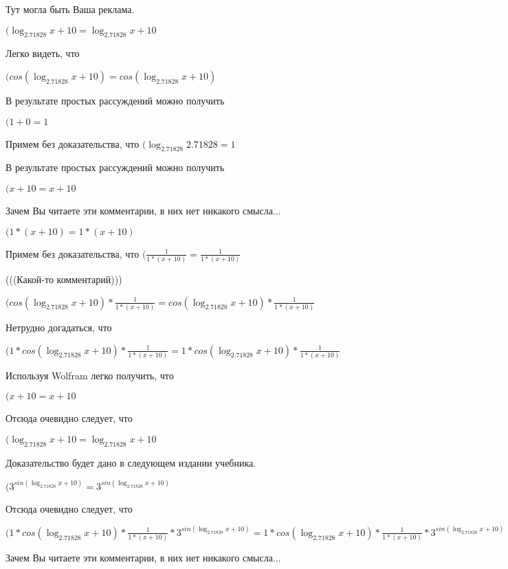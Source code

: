 \documentclass[12pt,a4paper,fleqn]{article}
\theoremstyle{definition}
\begin{document}
Тут могла быть Ваша реклама.

$(\log_{ 2.71828 }{ x  +  10 } = \log_{ 2.71828 }{ x  +  10 }$

Легко видеть, что

$(cos(\log_{ 2.71828 }{ x  +  10 }) = cos(\log_{ 2.71828 }{ x  +  10 })$

В результате простых рассуждений можно получить

$( 1  +  0  =  1 $

Примем без доказательства, что
$(\log_{ 2.71828 }{ 2.71828 } =  1 $

В результате простых рассуждений можно получить

$( x  +  10  =  x  +  10 $

Зачем Вы читаете эти комментарии, в них нет никакого смысла...

$( 1  * ( x  +  10 ) =  1  * ( x  +  10 )$

Примем без доказательства, что
$(\frac{ 1 }{ 1  * ( x  +  10 )}
 = \frac{ 1 }{ 1  * ( x  +  10 )}
$

(((Какой-то комментарий)))

$(cos(\log_{ 2.71828 }{ x  +  10 }) * \frac{ 1 }{ 1  * ( x  +  10 )}
 = cos(\log_{ 2.71828 }{ x  +  10 }) * \frac{ 1 }{ 1  * ( x  +  10 )}
$

Нетрудно догадаться, что

$( 1  * cos(\log_{ 2.71828 }{ x  +  10 }) * \frac{ 1 }{ 1  * ( x  +  10 )}
 =  1  * cos(\log_{ 2.71828 }{ x  +  10 }) * \frac{ 1 }{ 1  * ( x  +  10 )}
$

Используя Wolfram легко получить, что

$( x  +  10  =  x  +  10 $

Отсюда очевидно следует, что

$(\log_{ 2.71828 }{ x  +  10 } = \log_{ 2.71828 }{ x  +  10 }$

Доказательство будет дано в следующем издании учебника.

$({ 3 }^{sin(\log_{ 2.71828 }{ x  +  10 })} = { 3 }^{sin(\log_{ 2.71828 }{ x  +  10 })}$

Отсюда очевидно следует, что

$( 1  * cos(\log_{ 2.71828 }{ x  +  10 }) * \frac{ 1 }{ 1  * ( x  +  10 )}
 * { 3 }^{sin(\log_{ 2.71828 }{ x  +  10 })} =  1  * cos(\log_{ 2.71828 }{ x  +  10 }) * \frac{ 1 }{ 1  * ( x  +  10 )}
 * { 3 }^{sin(\log_{ 2.71828 }{ x  +  10 })}$

Зачем Вы читаете эти комментарии, в них нет никакого смысла...
\end{document}
